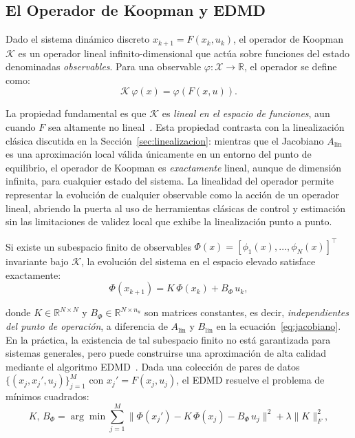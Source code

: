\documentclass[12pt,letterpaper]{article}
\begin{document}
\subsection{El Operador de Koopman y EDMD}
\label{sec:koopman_edmd}

Dado el sistema dinámico discreto $x_{k+1} = F(x_k, u_k)$, el operador de Koopman
$\mathcal{K}$ es un operador lineal infinito-dimensional que actúa sobre funciones
del estado denominadas \emph{observables}. Para una observable
$\varphi: \mathcal{X} \to \mathbb{R}$, el operador se define como:
\begin{equation}
\mathcal{K}\,\varphi(x) = \varphi(F(x,u)).
\end{equation}

La propiedad fundamental es que $\mathcal{K}$ es \emph{lineal en el espacio de
funciones}, aun cuando $F$ sea altamente no lineal~\cite{koopman1931,mezic2005}. Esta
propiedad contrasta con la linealización clásica discutida en la
Sección~\ref{sec:linealizacion}: mientras que el Jacobiano $A_{\mathrm{lin}}$ es una
aproximación local válida únicamente en un entorno del punto de equilibrio, el
operador de Koopman es \emph{exactamente} lineal, aunque de dimensión
infinita, para cualquier estado del sistema. La linealidad del operador permite
representar la evolución de cualquier observable como la acción de un operador
lineal, abriendo la puerta al uso de herramientas clásicas de control y
estimación~\cite{brunton2016,mauroy2020} sin las limitaciones de validez local que
exhibe la linealización punto a punto.

Si existe un subespacio finito de observables $\Phi(x) = [\phi_1(x),\ldots,\phi_N(x)]^\top$
invariante bajo $\mathcal{K}$, la evolución del sistema en el espacio elevado satisface
exactamente:
\begin{equation}
\Phi(x_{k+1}) = K\,\Phi(x_k) + B_\Phi\,u_k,
\label{eq:koopman_lineal}
\end{equation}

donde $K \in \mathbb{R}^{N\times N}$ y $B_\Phi \in \mathbb{R}^{N\times n_u}$ son
matrices constantes, es decir, \emph{independientes del punto de operación}, a
diferencia de $A_{\mathrm{lin}}$ y $B_{\mathrm{lin}}$ en la
ecuación~\eqref{eq:jacobiano}. En la práctica, la existencia de tal subespacio finito
no está garantizada para sistemas generales, pero puede construirse una aproximación
de alta calidad mediante el algoritmo EDMD~\cite{williams2015}. Dada una colección de
pares de datos $\{(x_j, x_j', u_j)\}_{j=1}^M$ con $x_j' = F(x_j, u_j)$, el EDMD resuelve
el problema de mínimos cuadrados:
\begin{equation}
K,\,B_\Phi = \arg\min \sum_{j=1}^{M} \bigl\|\Phi(x_j') - K\,\Phi(x_j) - B_\Phi\,u_j\bigr\|^2 + \lambda\|K\|_F^2,
\label{eq:edmd}
\end{equation}
\end{document}
